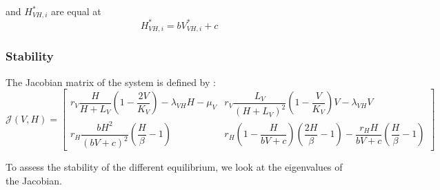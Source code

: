 \documentclass{article}
\newcommand{\lv}{\lambda_{VH}}
\begin{document}
and $H^*_{VH,i}$ are equal at
\begin{equation}
H^*_{VH,i} = b V^*_{VH,i} + c
\label{equilibreVH:H}
\end{equation}

\subsubsection{Stability}
The Jacobian matrix of the system is defined by :
\begin{equation}
\mathcal{J}(V,H) =  \begin{bmatrix}
r_V \dfrac{H}{H+L_V}(1-\dfrac{2V}{K_V}) - \lv H - \mu_V & r_V \dfrac{L_V}{(H+L_V)^2}(1-\dfrac{V}{K_V})V  - \lv V\\
r_H \dfrac{bH^2}{(bV+c)^2} (\dfrac{H}{\beta}-1) & r_H(1-\dfrac{H}{bV+c})(\dfrac{2H}{\beta}-1) - \dfrac{r_H H}{bV+c}(\dfrac{H}{\beta}-1)
\end{bmatrix}
\label{stabilityVH:jacobian}
\end{equation}

To assess the stability of the different equilibrium, we look at the eigenvalues of the Jacobian.
\end{document}
